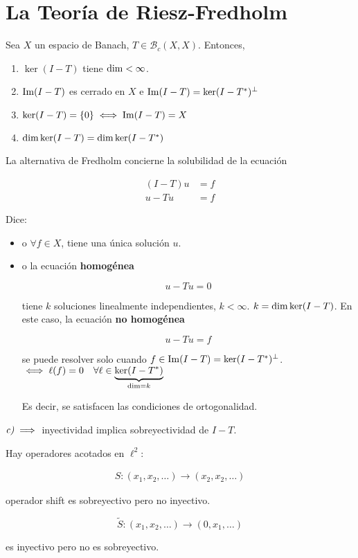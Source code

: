 \section{La Teoría de Riesz-Fredholm}

\begin{ftheorem}
   Sea $X$ un espacio de Banach, $T\in \mathcal{B}_c(X,X)$. Entonces,

   \begin{enumerate}[label=\alph*)]
      \item $\ker (I-T)$ tiene $\operatorname{dim}<\infty$.
      \item $\operatorname{Im} (I-T)$ es cerrado en $X$ e $\operatorname{Im}(I-T)=\ker (I-T^*)^\perp$
      \item $\ker(I-T)=\{0\}\iff \operatorname{Im}(I-T)=X$
      \item $\operatorname{dim}\ker(I-T)=\operatorname{dim}\ker(I-T^*)$
   \end{enumerate}
\end{ftheorem}

\begin{fnote}
   La alternativa de Fredholm concierne la solubilidad de la ecuación

   \begin{align*}
      (I-T)u&=f\\
      u-Tu&=f
   \end{align*}

   Dice:

   \begin{itemize}
      \item o $\forall f\in X$, tiene una única solución $u$.
      \item o la ecuación \textbf{homogénea}
      
      \[u-Tu=0\]

      tiene $k$ soluciones linealmente independientes, $k<\infty$. $k=\operatorname{dim}\ker (I-T)$. En este caso, la ecuación \textbf{no homogénea} 

      \[u-Tu=f\]

      se puede resolver solo cuando $f\in \operatorname{Im} (I-T)=\ker(I-T^*)^\perp$.\\
      $\iff \ell(f)=0\quad \forall \ell\in \underbrace{\ker(I-T^*)}_{\operatorname{dim}=k}$

      Es decir, se satisfacen las condiciones de ortogonalidad.
   \end{itemize}
\end{fnote}

\begin{fnote}
   $\emph{c)} \implies$ inyectividad implica sobreyectividad de $I-T$.

   Hay operadores acotados en $\ell^2$:

   \begin{align*}
      S:(x_1,x_2,\ldots)\to(x_2,x_2,\ldots)
   \end{align*}

   operador shift es sobreyectivo pero no inyectivo.

   \[\tilde S:(x_1,x_2,\ldots)\to (0,x_1,\ldots)\]

   es inyectivo pero no es sobreyectivo.
\end{fnote} 

